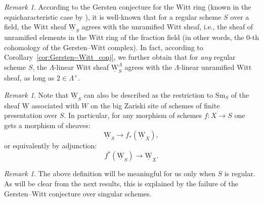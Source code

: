 \documentclass[11pt]{article}
\newcommand{\ie}{i.e.,\xspace}
\numberwithin{equation}{section}\renewcommand{\encodingdefault}{TU}
\newcommand{\uW}{\underline{\mathrm W}}
\newcommand{\sm}{\mathrm{Sm}}
\theoremstyle{remark}
\newtheorem{rem}[thm]{Remark}
\theoremstyle{definition}
\numberwithin{equation}{thm}
\begin{document}
\begin{rem}\label{rem:terminology_unramified_Witt}
According to the Gersten conjecture for the Witt ring
(known in the equicharacteristic case by \cite{BalmerGillePaninWalter}),
it is well-known that for a regular scheme $S$ over a field,
the Witt sheaf $\uW_S$ agrees with the unramified Witt sheaf, \ie the sheaf of unramified elements in the Witt ring of the fraction field (in other words, the $0$-th cohomology of the Gersten--Witt complex).
In fact, according to Corollary~\ref{cor:Gersten--Witt_conj},
we further obtain that for \emph{any} regular scheme $S$,
the $\Lambda$-linear Witt sheaf $\uW_S^\Lambda$ agrees with the $\Lambda$-linear unramified Witt sheaf, as long as $2\in \Lambda^\times$.
\end{rem}

\begin{rem}
Note that $\uW_S$ can also be described as the restriction to $\sm_S$ of the sheaf $\uW$ associated with $W$ on the big Zariski site of schemes of finite presentation over $S$.
In particular, for any morphism of schemes $f:X \to S$ one gets a morphism of sheaves:
\begin{equation}\label{eq:funct1_uW}
\uW_S \to f_*(\uW_X),
\end{equation}
or equivalently by adjunction:
\begin{equation}\label{eq:funct2_uW}
f^*(\uW_S) \to \uW_X.
\end{equation}
\end{rem}

\begin{rem}\label{rem:W_S singular}
The above definition will be meaningful for us only when $S$ is regular.
As will be clear from the next results, this is explained by the failure of the Gersten--Witt conjecture over singular schemes.
\end{rem}
\end{document}
